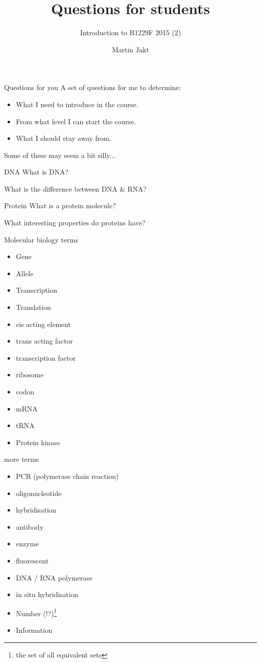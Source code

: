 \documentclass[pdf]{beamer}
\title{Questions for students}
\subtitle{Introduction to B1229F 2015 (2)}
\author{Martin Jakt}
\begin{document}
\begin{frame}
  \titlepage
\end{frame}

\begin{frame}{Questions for you}
  A set of questions for me to determine:
  \begin{itemize}
    \item What I need to introduce in the course.
    \item From what level I can start the course.
    \item What I should stay away from.
  \end{itemize}
  Some of these may seem a bit silly...
\end{frame}

\begin{frame}{DNA}
  What is DNA?

  What is the difference between DNA \& RNA?
\end{frame}

\begin{frame}{Protein}
  What is a protein molecule?

  What interesting properties do proteins have?
\end{frame}

\begin{frame}{Molecular biology terms}
  \begin{itemize}
    \item Gene
    \item Allele
    \item Transcription
    \item Translation
    \item cis acting element
    \item trans acting factor
    \item transcription factor
    \item ribosome
    \item codon
    \item mRNA
    \item tRNA
    \item Protein kinase
  \end{itemize}
\end{frame}

\begin{frame}{more terms}
  \begin{itemize}
    \item PCR (polymerase chain reaction)
    \item oligonucleotide
    \item hybridisation
    \item antibody
    \item enzyme
    \item fluorescent
    \item DNA / RNA polymerase
    \item in situ hybridisation
    \item Number (!?)\footnote{the set of all equivalent sets}
    \item Information
  \end{itemize}
\end{frame}
\end{document}
